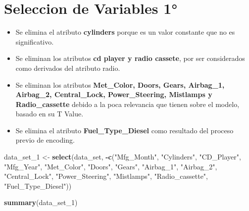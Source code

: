 \documentclass[]{article}
\newenvironment{Shaded}{\begin{snugshade}}{\end{snugshade}}
\newcommand{\DecValTok}[1]{\textcolor[rgb]{0.00,0.00,0.81}{#1}}
\newcommand{\KeywordTok}[1]{\textcolor[rgb]{0.13,0.29,0.53}{\textbf{#1}}}
\newcommand{\NormalTok}[1]{#1}
\newcommand{\OperatorTok}[1]{\textcolor[rgb]{0.81,0.36,0.00}{\textbf{#1}}}
\newcommand{\StringTok}[1]{\textcolor[rgb]{0.31,0.60,0.02}{#1}}
\providecommand{\tightlist}{%
  \setlength{\itemsep}{0pt}\setlength{\parskip}{0pt}}
\begin{document}
\hypertarget{seleccion-de-variables-1}{%
\section{Seleccion de Variables 1°}\label{seleccion-de-variables-1}}

\begin{itemize}
\tightlist
\item
  Se elimina el atributo \textbf{cylinders} porque es un valor constante
  que no es significativo.\\
\item
  Se eliminan los atributos \textbf{cd player y radio cassete}, por ser
  considerados como derivados del atributo radio.\\
\item
  Se eliminan los atributos \textbf{Met\_Color, Doors, Gears, Airbag\_1,
  Airbag\_2, Central\_Lock, Power\_Steering, Mistlamps y
  Radio\_cassette} debido a la poca relevancia que tienen sobre el
  modelo, basado en su T Value.\\
\item
  Se elimina el atributo \textbf{Fuel\_Type\_Diesel} como resultado del
  proceso previo de encoding.
\end{itemize}

\begin{Shaded}
\begin{Highlighting}[]
\NormalTok{data_set_}\DecValTok{1}\NormalTok{ <-}\StringTok{ }\KeywordTok{select}\NormalTok{(data_set, }\OperatorTok{-}\KeywordTok{c}\NormalTok{(}\StringTok{"Mfg_Month"}\NormalTok{, }
                                  \StringTok{"Cylinders"}\NormalTok{, }
                                  \StringTok{"CD_Player"}\NormalTok{, }\StringTok{"Mfg_Year"}\NormalTok{, }\StringTok{"Met_Color"}\NormalTok{, }\StringTok{"Doors"}\NormalTok{, }\StringTok{"Gears"}\NormalTok{, }\StringTok{"Airbag_1"}\NormalTok{, }\StringTok{"Airbag_2"}\NormalTok{, }\StringTok{"Central_Lock"}\NormalTok{, }\StringTok{"Power_Steering"}\NormalTok{, }\StringTok{"Mistlamps"}\NormalTok{, }\StringTok{"Radio_cassette"}\NormalTok{, }\StringTok{"Fuel_Type_Diesel"}\NormalTok{))}
\end{Highlighting}
\end{Shaded}

\begin{Shaded}
\begin{Highlighting}[]
\KeywordTok{summary}\NormalTok{(data_set_}\DecValTok{1}\NormalTok{)}
\end{Highlighting}
\end{Shaded}
\end{document}
